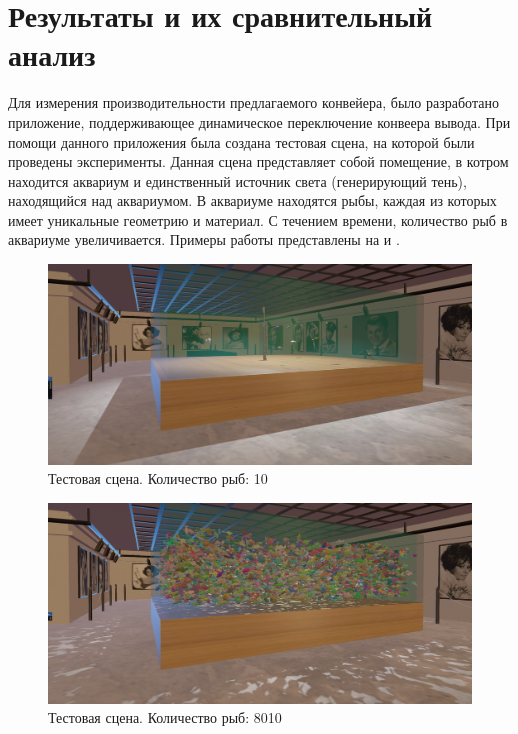 \chapter{Результаты и их сравнительный анализ} \label{ch4}


	Для измерения производительности предлагаемого конвейера, было разработано приложение, поддерживающее динамическое переключение конвеера вывода. При помощи данного приложения была создана тестовая сцена, на которой были проведены эксперименты. Данная сцена представляет собой помещение, в котром находится аквариум и единственный источник света (генерирующий тень), находящийся над аквариумом. В аквариуме находятся рыбы, каждая из которых имеет уникальные геометрию и материал. С течением времени, количество рыб в аквариуме увеличивается. Примеры работы представлены на  и .
	
	\begin{figure}[ht!] 
		\center
		\includegraphics [scale=0.4] {my_folder/images//empty_aquarium}	
		\caption{Тестовая сцена. Количество рыб: 10} 
		\label{fig:empty_aquarium}
	\end{figure}
	
	\begin{figure}[ht!] 
		\center
		\includegraphics [scale=0.4] {my_folder/images//full_aquarium}	
		\caption{Тестовая сцена. Количество рыб: 8010} 
		\label{fig:full_aquarium}
	\end{figure}
	
